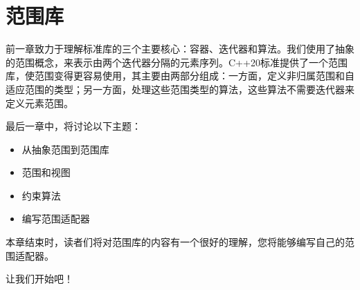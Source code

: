 \chapter{范围库}
前一章致力于理解标准库的三个主要核心：容器、迭代器和算法。我们使用了抽象的范围概念，来表示由两个迭代器分隔的元素序列。C++20标准提供了一个范围库，使范围变得更容易使用，其主要由两部分组成：一方面，定义非归属范围和自适应范围的类型；另一方面，处理这些范围类型的算法，这些算法不需要迭代器来定义元素范围。

最后一章中，将讨论以下主题：

\begin{itemize}
  \item 从抽象范围到范围库
  \item 范围和视图
  \item 约束算法
  \item 编写范围适配器
\end{itemize}

本章结束时，读者们将对范围库的内容有一个很好的理解，您将能够编写自己的范围适配器。

让我们开始吧！








